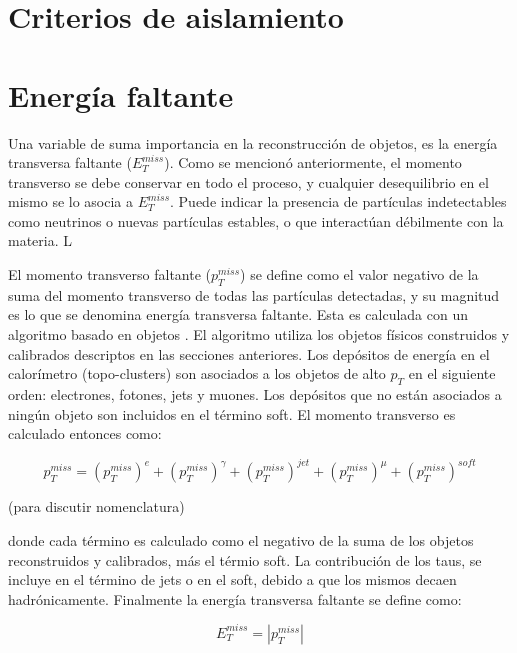 \section{Criterios de aislamiento}





\section{Energía faltante}

Una variable de suma importancia en la reconstrucción de objetos, es la energía transversa faltante ($E_{T}^{miss}$). Como se mencionó anteriormente, el momento transverso se debe conservar en todo el proceso, y cualquier desequilibrio en el mismo se lo asocia a $E_{T}^{miss}$. Puede indicar la presencia de partículas indetectables como neutrinos o nuevas partículas estables, o que interactúan débilmente con la materia. L

El momento transverso faltante ($p_{T}^{miss}$) se define como el valor negativo de la suma del momento transverso de todas las partículas detectadas, y su magnitud es lo que se denomina energía transversa faltante. Esta es calculada con un algoritmo basado en objetos \cite{Khoo:2012749}. El algoritmo utiliza los objetos físicos construidos y calibrados descriptos en las secciones anteriores. Los depósitos de energía en el calorímetro (topo-clusters) son asociados a los objetos de alto $p_{T}$ en el siguiente orden: electrones, fotones, jets y muones. Los depósitos que no están asociados a ningún objeto son incluidos en el término soft. El momento transverso es calculado entonces como:

\begin{equation}
p_{T}^{miss}=\left(p_{T}^{miss}\right)^{e} + \left(p_{T}^{miss}\right)^{\gamma} + \left(p_{T}^{miss}\right)^{jet} +\left(p_{T}^{miss}\right)^{\mu} + \left(p_{T}^{miss}\right)^{soft}
\end{equation}

(para discutir nomenclatura)

donde cada término es calculado como el negativo de la suma de los objetos reconstruidos y calibrados, más el térmio soft. La contribución de los taus, se incluye en el término de jets o en el soft, debido a que los mismos decaen hadrónicamente. Finalmente la energía transversa faltante se define como:

\begin{equation}
E_{T}^{miss}=|p_{T}^{miss}|
\end{equation}

\normalsize